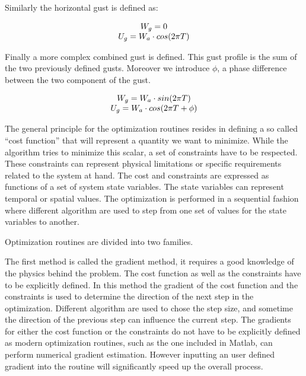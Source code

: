 \par Similarly the horizontal gust is defined as:

\begin{equation}
  \begin{array}[c]{c}
    W_g = 0 \\
    U_g = W_a \cdot cos(2 \pi T)
  \end{array}
  \label{eqn:horizontal_gust_definition}
\end{equation}

\par Finally a more complex combined gust is defined.
This gust profile is the sum of the two previously defined gusts.
Moreover we introduce $\phi$, a phase difference between the two component of the gust. 

\begin{equation}
  \begin{array}[c]{c}
    W_g = W_a \cdot sin(2\pi T) \\
    U_g = W_a \cdot cos(2 \pi T + \phi)
  \end{array}
  \label{eqn:combined_gust_definition}
\end{equation}


The general principle for the optimization routines resides in defining a so called ``cost function'' that will represent a quantity we want to minimize.
While the algorithm tries to minimize this scalar, a set of constraints have to be respected. 
These constraints can represent physical limitations or specific requirements related to the system at hand.
The cost and constraints are expressed as functions of a set of system state variables.
The state variables can represent temporal or spatial values.
The optimization is performed in a sequential fashion where different algorithm are used to step from one set of values for the state variables to another. 

\par Optimization routines are divided into two families. 

\par The first method is called the gradient method, it requires a good knowledge of the physics behind the problem.
The cost function as well as the constraints have to be explicitly defined.
In this method the gradient of the cost function and the constraints is used to determine the direction of the next step in the optimization.
Different algorithm are used to chose the step size, and sometime the direction of the previous step can influence the current step.
The gradients for either the cost function or the constraints do not have to be explicitly defined as modern optimization routines, such as the one included in Matlab, can perform numerical gradient estimation.
However inputting an user defined gradient into the routine will significantly speed up the overall process.

